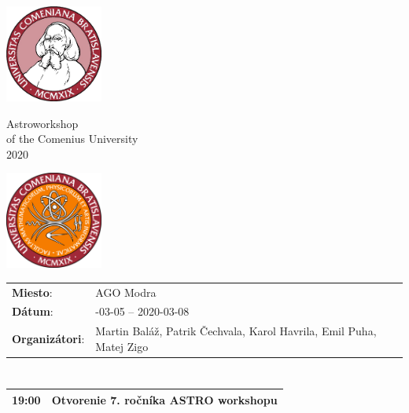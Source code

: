 \documentclass[a4paper]{report}
\begin{document}
    \begin{minipage}{\textwidth}
        \begin{minipage}{0.2\textwidth}
            \includegraphics[width=32mm]{input/logo.jpg}
        \end{minipage}
        \begin{minipage}{0.58\textwidth}
            \centering
            \fontsize{40}{50}\selectfont
            Astroworkshop\\
            \large
            of the Comenius University\\
            2020
        \end{minipage}
        \begin{minipage}{0.2\textwidth}
            \includegraphics[width=32mm]{input/fmfi.png}
        \end{minipage}
    \end{minipage}
    \vspace*{10mm}

    \begin{tabularx}{\textwidth}{>{}p{2cm} >{\RaggedRight}X}
        \textbf{Miesto}:    & AGO Modra \\
        \textbf{Dátum}:     & 2020-03-05 -- 2020-03-08 \\
        \textbf{Organizátori}: &
            Martin Baláž,             Patrik Čechvala,             Karol Havrila,             Emil Puha,             Matej Zigo             \\
    \end{tabularx}

            \section{\color[rgb]{0, 0.1, 0.4}{štvrtok}}

        \begin{tabularx}{\textwidth}{>{}p{2cm} >{\RaggedRight}X}
            \toprule
                            {\Large 19:00} & {\Large Otvorenie 7. ročníka ASTRO workshopu} \\
                                                                                                        \bottomrule
        \end{tabularx}
\end{document}
